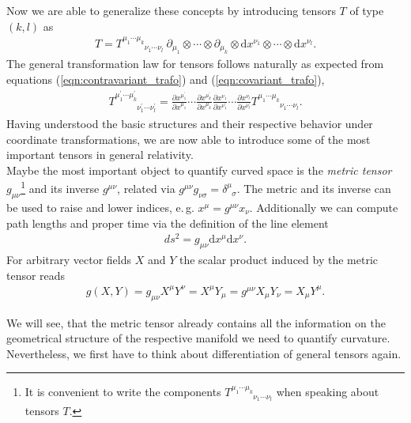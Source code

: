 Now we are able to generalize these concepts by introducing tensors $T$ of type $(k,l)$ as
\begin{align}
T=T_{\phantom{\mu_{1} \cdots \mu_{k}}\nu_{1} \cdots \nu_{l}}^{\mu_{1} \cdots \mu_{k}} \ \partial_{\mu_{1}} \otimes \cdots \otimes \partial_{\mu_{k}} \otimes \mathrm{d} x^{\nu_{1}} \otimes \cdots \otimes \mathrm{d} x^{\nu_{l}}.
\end{align}
The general transformation law for tensors follows naturally as expected from equations (\ref{eqn:contravariant_trafo}) and (\ref{eqn:covariant_trafo}),
\begin{align}
	T_{\phantom{\mu_{1}^{\prime} \cdots \mu_{k}^{\prime}}\nu_{1}^{\prime} \cdots \nu_{l}^{\prime}}^{\mu_{1}^{\prime} \cdots \mu_{k}^{\prime}}=\frac{\partial x^{\mu_{1}^{\prime}}}{\partial x^{\mu_{1}}} \cdots \frac{\partial x^{\mu_{k}^{\prime}}}{\partial x^{\mu_{k}}} \frac{\partial x^{\nu_{1}}}{\partial x^{\nu_{1}^{\prime}}} \cdots \frac{\partial x^{\nu_{l}}}{\partial x^{\nu_{l}^{\prime}}} T^{\mu_{1} \cdots \mu_{k}}_{\phantom{\mu_{1} \cdots \mu_{k}}\nu_{1} \cdots \nu_{l}}.
\end{align}
Having understood the basic structures and their respective behavior under coordinate transformations, we are now able to introduce some of the most important tensors in general relativity. \\
Maybe the most important object to quantify curved space is the \textit{metric tensor} $g_{\mu\nu}$\footnote{It is convenient to write the components $T_{\phantom{\mu_{1} \cdots \mu_{k}}\nu_{1} \cdots \nu_{l}}^{\mu_{1} \cdots \mu_{k}}$ when speaking about tensors $T$.} and its inverse  $g^{\mu\nu}$, related via $g^{\mu\nu}g_{\nu\sigma} = \delta^{\mu}_{\phantom{\mu}\sigma}$. The metric and its inverse can be used to raise and lower indices, e.\,g. $x^{\mu} = g^{\mu\nu}x_{\nu}$. Additionally we can compute path lengths and proper time via the definition of the line element 
\begin{align}
	d s^{2}=g_{\mu \nu} \mathrm{d} x^{\mu} \mathrm{d} x^{\nu}.
\end{align}
For arbitrary vector fields $X$ and $Y$ the scalar product induced by the metric tensor reads
\begin{align}
	g(X,Y) = g_{\mu\nu}X^{\mu}Y^{\nu} = X^{\mu}Y_{\mu}= g^{\mu\nu}X_{\mu}Y_{\nu} = X_{\mu}Y^{\mu}.
\end{align}

We will see, that the metric tensor already contains all the information on the geometrical structure of the respective manifold we need to quantify curvature. Nevertheless, we first have to think about differentiation of general tensors again. 

